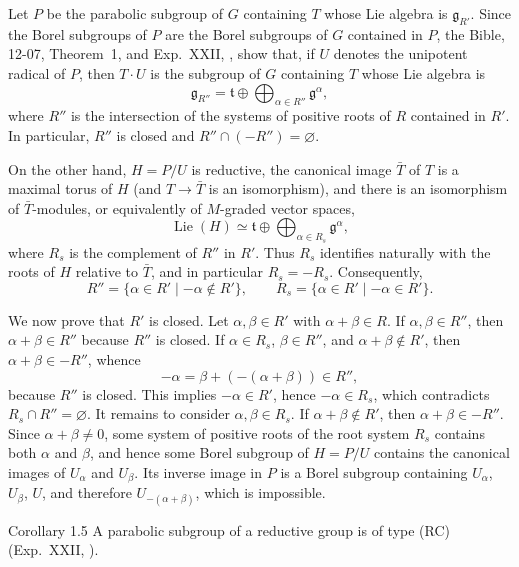 Let \(P\) be the parabolic subgroup of \(G\) containing \(T\) whose Lie
algebra is \(\mathfrak g_{R'}\).  Since the Borel subgroups of \(P\) are the
Borel subgroups of \(G\) contained in \(P\), the Bible, 12-07, Theorem~1,
and Exp.\ XXII, , show that, if \(U\) denotes the unipotent radical
of \(P\), then \(T\cdot U\) is the subgroup of \(G\) containing \(T\) whose
Lie algebra is
\[
 \mathfrak g_{R''}=\mathfrak t\oplus
 \bigoplus_{\alpha\in R''}\mathfrak g^\alpha,
\]
where \(R''\) is the intersection of the systems of positive roots of \(R\)
contained in \(R'\).  In particular, \(R''\) is closed and
\(R''\cap(-R'')=\varnothing\).

On the other hand, \(H=P/U\) is reductive, the canonical image \(\bar T\)
of \(T\) is a maximal torus of \(H\) (and \(T\to\bar T\) is an
isomorphism), and there is an isomorphism of \(\bar T\)-modules, or
equivalently of \(M\)-graded vector spaces,
\[
 \operatorname{Lie}(H)\simeq\mathfrak t\oplus
 \bigoplus_{\alpha\in R_s}\mathfrak g^\alpha,
\]
where \(R_s\) is the complement of \(R''\) in \(R'\).  Thus \(R_s\)
identifies naturally with the roots of \(H\) relative to \(\bar T\), and in
particular \(R_s=-R_s\).  Consequently,
\[
 R''=\{\alpha\in R'\mid-\alpha\notin R'\},
 \qquad
 R_s=\{\alpha\in R'\mid-\alpha\in R'\}.
\]

We now prove that \(R'\) is closed.  Let \(\alpha,\beta\in R'\) with
\(\alpha+\beta\in R\).  If \(\alpha,\beta\in R''\), then
\(\alpha+\beta\in R''\) because \(R''\) is closed.  If
\(\alpha\in R_s\), \(\beta\in R''\), and \(\alpha+\beta\notin R'\), then
\(\alpha+\beta\in-R''\), whence
\[
 -\alpha=\beta+(-(\alpha+\beta))\in R'',
\]
because \(R''\) is closed.  This implies \(-\alpha\in R'\), hence
\(-\alpha\in R_s\), which contradicts \(R_s\cap R''=\varnothing\).  It remains to consider
\(\alpha,\beta\in R_s\).  If \(\alpha+\beta\notin R'\), then
\(\alpha+\beta\in-R''\).  Since \(\alpha+\beta\ne0\), some system of
positive roots of the root system \(R_s\) contains both \(\alpha\) and
\(\beta\), and hence some Borel subgroup of \(H=P/U\) contains the canonical
images of \(U_\alpha\) and \(U_\beta\).  Its inverse image in \(P\) is a
Borel subgroup containing \(U_\alpha\), \(U_\beta\), \(U\), and therefore
\(U_{-(\alpha+\beta)}\), which is impossible.

\begin{sgastatement}{Corollary 1.5}
A parabolic subgroup of a reductive group is of type \textup{(RC)}
\textup{(Exp.\ XXII, )}.
\end{sgastatement}

